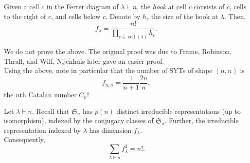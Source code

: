 	\begin{ftheo}
		Given a cell $c$ in the Ferrer diagram of $\lambda \vdash n$, the \emph{hook} at cell $c$ consists of $c$, cells to the right of $c$, and cells below $c$. Denote by $h_c$ the size of the hook at $\lambda$. Then,
		\[ f_\lambda = \frac{n!}{\prod_{c \in \operatorname{cell}(\lambda)} h_c}. \]
	\end{ftheo}
	We do not prove the above. The original proof was due to Frame, Robinson, Thrall, and Wilf, Nijenhuis later gave an easier proof.\\
	Using the above, note in particular that the number of SYTs of shape $(n,n)$ is
	\[ f_{n,n} = \frac{1}{n+1} \frac{2n}{n}, \]
	the $n$th Catalan number $C_n$!

	\begin{ftheo}
		Let $\lambda \vdash n$. Recall that $\mathfrak{S}_n$ has $p(n)$ distinct irreducible representations (up to isomorphism), indexed by the conjugacy classes of $\mathfrak{S}_n$. Further, the irreducible representation indexed by $\lambda$ has dimension $f_\lambda$.\\
		Consequently,
		\[ \sum_{\lambda \vdash n} f_\lambda^2 = n!. \]
	\end{ftheo}



